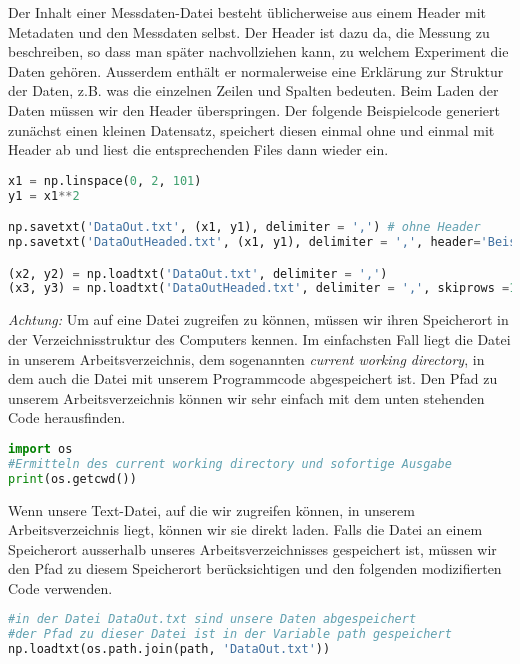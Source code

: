 Der Inhalt einer Messdaten-Datei besteht üblicherweise aus einem Header mit Metadaten und den Messdaten selbst. Der Header ist dazu da, die Messung zu beschreiben, so dass man später nachvollziehen kann, zu welchem Experiment die Daten gehören. Ausserdem enthält er normalerweise eine Erklärung zur Struktur der Daten, z.B. was die einzelnen Zeilen und Spalten bedeuten. Beim Laden der Daten müssen wir den Header überspringen. Der folgende Beispielcode generiert zunächst einen kleinen Datensatz, speichert diesen einmal ohne und einmal mit Header ab und liest die entsprechenden Files dann wieder ein.

\begin{lstlisting}[language = Python]
x1 = np.linspace(0, 2, 101)
y1 = x1**2

np.savetxt('DataOut.txt', (x1, y1), delimiter = ',') # ohne Header
np.savetxt('DataOutHeaded.txt', (x1, y1), delimiter = ',', header='Beispieldatei') # mit Header

(x2, y2) = np.loadtxt('DataOut.txt', delimiter = ',')
(x3, y3) = np.loadtxt('DataOutHeaded.txt', delimiter = ',', skiprows =1)
\end{lstlisting}



\textit{Achtung:} Um auf eine Datei zugreifen zu können, müssen wir ihren Speicherort in der Verzeichnisstruktur des Computers kennen. Im einfachsten Fall liegt die Datei in unserem Arbeitsverzeichnis, dem sogenannten \textit{current working directory}, in dem auch die Datei mit unserem Programmcode abgespeichert ist. Den Pfad zu unserem Arbeitsverzeichnis können wir sehr einfach mit dem unten stehenden Code herausfinden.  
\begin{lstlisting}[language = Python]
import os
#Ermitteln des current working directory und sofortige Ausgabe
print(os.getcwd())
\end{lstlisting}
Wenn unsere Text-Datei, auf die wir zugreifen können, in unserem Arbeitsverzeichnis liegt, können wir sie direkt laden. Falls die Datei an einem Speicherort ausserhalb unseres Arbeitsverzeichnisses gespeichert ist, müssen wir den Pfad zu diesem Speicherort berücksichtigen und den folgenden modizifierten Code verwenden.
\begin{lstlisting}[language = Python]
#in der Datei DataOut.txt sind unsere Daten abgespeichert
#der Pfad zu dieser Datei ist in der Variable path gespeichert 
np.loadtxt(os.path.join(path, 'DataOut.txt'))
\end{lstlisting}







